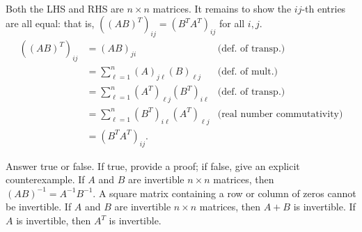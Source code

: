 \\ 
\begin{solution}
\noindent
Both the LHS and RHS are $n\times n$ matrices. It remains to show the $ij$-th entries are all equal: that is, $((AB)^T)_{ij}=(B^TA^T)_{ij}$ for all $i,j$. 
\begin{align*}
((AB)^T)_{ij}&=(AB)_{ji} & \text{(def. of transp.)}\\
&=\sum_{\ell=1}^n(A)_{j\ell}(B)_{\ell j} &\text{(def. of mult.)}\\
&=\sum_{\ell=1}^n(A^T)_{\ell j}(B^T)_{i\ell} &\text{(def. of transp.)}\\
&=\sum_{\ell=1}^n(B^T)_{i\ell}(A^T)_{\ell j} &\text{(real number commutativity)}\\
&=(B^TA^T)_{ij}.
\end{align*}

\end{solution}
\ii Answer true or false. If true, provide a proof; if false, give an explicit counterexample. 
\bb[(a)]
\ii If $A$ and $B$ are invertible $n\times n$ matrices, then $(AB)^{-1} = A^{-1}B^{-1}$.
\ii A square matrix containing a row or column of zeros cannot be invertible.
\ii If $A$ and $B$ are invertible $n\times n$ matrices, then $A+B$ is invertible. 
\ii If $A$ is invertible, then $A^T$ is invertible. 
\ee
\ \\
